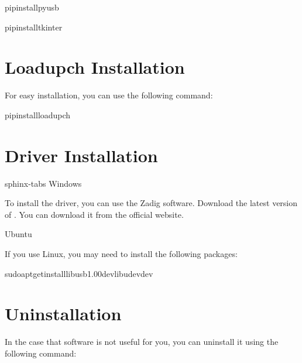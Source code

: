 \documentclass[letterpaper,10pt,english]{sphinxmanual}
\begin{document}
\begin{sphinxVerbatim}[commandchars=\\\{\}]
pipinstallpyusb
\end{sphinxVerbatim}

\begin{sphinxVerbatim}[commandchars=\\\{\}]
pipinstalltkinter
\end{sphinxVerbatim}


\section{Loadupch Installation}
\label{\detokenize{installation:loadupch-installation}}
\sphinxAtStartPar
For easy installation, you can use the following command:

\begin{sphinxVerbatim}[commandchars=\\\{\}]
pipinstallloadupch
\end{sphinxVerbatim}


\section{Driver Installation}
\label{\detokenize{installation:driver-installation}}
\begin{sphinxuseclass}{sphinx-tabs}
\sphinxAtStartPar
Windows

\sphinxAtStartPar
To install the driver, you can use the Zadig software. Download the latest version of . You can download it from the official website.
\begin{quote}


\end{quote}

\sphinxAtStartPar
Ubuntu

\sphinxAtStartPar
If you use Linux, you may need to install the following packages:

\begin{sphinxVerbatim}[commandchars=\\\{\}]
sudoapt\PYGZhy{}getinstalllibusb\PYGZhy{}1.0\PYGZhy{}0\PYGZhy{}devlibudev\PYGZhy{}dev
\end{sphinxVerbatim}

\end{sphinxuseclass}

\section{Uninstallation}
\label{\detokenize{installation:uninstallation}}
\sphinxAtStartPar
In the case that software is not useful for you, you can uninstall it using the following command:
\end{document}
